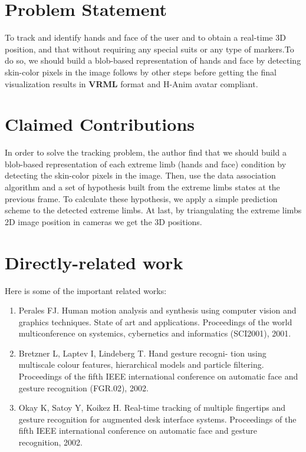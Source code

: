 \documentclass[a4paper]{article}
\begin{document}
\section{Problem Statement}
To track and identify hands and face of the user and to obtain a real-time 3D position, and that without requiring any special suits or
any type of markers.To do so, we should build a blob-based representation of hands and face by detecting skin-color pixels in the image
follows by other steps before getting the final visualization results in {\bf VRML} format and H-Anim avatar compliant.      

\section{Claimed Contributions}
In order to solve the tracking problem, the author find that we should build a blob-based representation of each
extreme limb (hands and face) condition by detecting the skin-color pixels in the image. Then, use the data association 
algorithm and a set of hypothesis built from the extreme limbs states at the previous frame.
To calculate these hypothesis, we apply a simple prediction scheme to the detected extreme limbs. At last, by triangulating the 
extreme limbs 2D image position in cameras we get the 3D positions.
 


\section{Directly-related work}
Here is some of the important related works: 
\begin{enumerate}
\item Perales FJ. Human motion analysis and synthesis using
computer vision and graphics techniques. State of art and
applications. Proceedings of the world multiconference on
systemics, cybernetics and informatics (SCI2001), 2001.
\item Bretzner L, Laptev I, Lindeberg T. Hand gesture recogni-
tion using multiscale colour features, hierarchical models
and particle filtering. Proceedings of the fifth IEEE
international conference on automatic face and gesture
recognition (FGR.02), 2002.
\item Okay K, Satoy Y, Koikez H. Real-time tracking of
multiple fingertips and gesture recognition for augmented
desk interface systems. Proceedings of the fifth IEEE
international conference on automatic face and gesture
recognition, 2002.
\end{enumerate}
\end{document}
